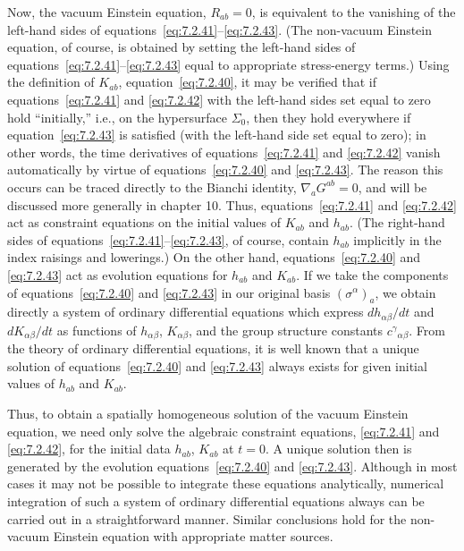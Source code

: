 Now, the vacuum Einstein equation, \(R_{ab}=0\), is equivalent to the vanishing of
the left-hand sides of equations~\eqref{eq:7.2.41}--\eqref{eq:7.2.43}. (The
non-vacuum Einstein equation, of course, is obtained by setting the left-hand sides
of equations~\eqref{eq:7.2.41}--\eqref{eq:7.2.43} equal to appropriate
stress-energy terms.) Using the definition of \(K_{ab}\),
equation~\eqref{eq:7.2.40}, it may be verified that if
equations~\eqref{eq:7.2.41} and \eqref{eq:7.2.42} with the left-hand sides set
equal to zero hold “initially,” i.e., on the hypersurface \(\Sigma_0\), then they
hold everywhere if equation~\eqref{eq:7.2.43} is satisfied (with the left-hand
side set equal to zero); in other words, the time derivatives of
equations~\eqref{eq:7.2.41} and \eqref{eq:7.2.42} vanish automatically by virtue
of equations~\eqref{eq:7.2.40} and \eqref{eq:7.2.43}. The reason this occurs can
be traced directly to the Bianchi identity, \(\nabla_aG^{ab}=0\), and will be
discussed more generally in chapter 10. Thus, equations~\eqref{eq:7.2.41} and
\eqref{eq:7.2.42} act as constraint equations on the initial values of \(K_{ab}\)
and \(h_{ab}\). (The right-hand sides of
equations~\eqref{eq:7.2.41}--\eqref{eq:7.2.43}, of course, contain \(h_{ab}\)
implicitly in the index raisings and lowerings.) On the other hand,
equations~\eqref{eq:7.2.40} and \eqref{eq:7.2.43} act as evolution equations for
\(h_{ab}\) and \(K_{ab}\). If we take the components of
equations~\eqref{eq:7.2.40} and \eqref{eq:7.2.43} in our original basis
\((\sigma^\alpha)_a\), we obtain directly a system of ordinary differential
equations which express \(dh_{\alpha\beta}/dt\) and \(dK_{\alpha\beta}/dt\) as
functions of \(h_{\alpha\beta}\), \(K_{\alpha\beta}\), and the group structure
constants \(c^\gamma{}_{\alpha\beta}\). From the theory of ordinary differential
equations, it is well known that a unique solution of equations~\eqref{eq:7.2.40}
and \eqref{eq:7.2.43} always exists for given initial values of \(h_{ab}\) and
\(K_{ab}\).

Thus, to obtain a spatially homogeneous solution of the vacuum Einstein equation,
we need only solve the algebraic constraint equations, \eqref{eq:7.2.41} and
\eqref{eq:7.2.42}, for the initial data \(h_{ab}\), \(K_{ab}\) at \(t=0\). A
unique solution then is generated by the evolution equations~\eqref{eq:7.2.40}
and \eqref{eq:7.2.43}. Although in most cases it may not be possible to integrate
these equations analytically, numerical integration of such a system of ordinary
differential equations always can be carried out in a straightforward manner.
Similar conclusions hold for the non-vacuum Einstein equation with appropriate
matter sources.


